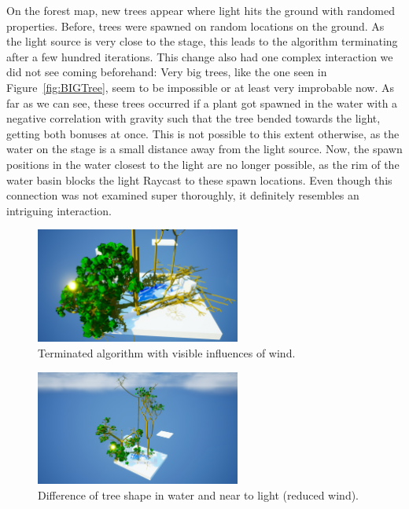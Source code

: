 \documentclass[11pt, abstract=on]{scrartcl}
\begin{document}
On the forest map, new trees appear where light hits the ground with randomed properties. Before, trees were spawned on random locations on the ground. As the light source is very close to the stage, this leads to the algorithm terminating after a few hundred iterations. This change also had one complex interaction we did not see coming beforehand: Very big trees, like the one seen in Figure~\ref{fig:BIGTree}, seem to be impossible or at least very improbable now. As far as we can see, these trees occurred if a plant got spawned in the water with a negative correlation with gravity such that the tree bended towards the light, getting both bonuses at once. This is not possible to this extent otherwise, as the water on the stage is a small distance away from the light source. Now, the spawn positions in the water closest to the light are no longer possible, as the rim of the water basin blocks the light Raycast to these spawn locations. Even though this connection was not examined super thoroughly, it definitely resembles an intriguing interaction.

\begin{figure}
 	 \centering
 	    \includegraphics[width=0.6\textwidth]{SS_StageWithWind.png}
 	 \caption{Terminated algorithm with visible influences of wind.}
 	 \label{fig:StageWind}
\end{figure}

\begin{figure}
 	 \centering
 	    \includegraphics[width=0.6\textwidth]{SS_StageTallTrees.png}
 	 \caption{Difference of tree shape in water and near to light (reduced wind).}
 	 \label{fig:StageTallTrees}
\end{figure}
\end{document}
